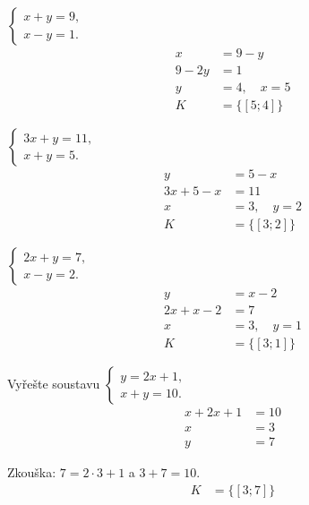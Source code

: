 \documentclass[11pt,a4paper]{article}
\begin{document}
\begin{zadaniReseniBox}[title={Samostatná práce 1}]
$\begin{cases}x+y=9,\\x-y=1.\end{cases}$
\tcblower
\[
\begin{aligned}
x&=9-y \\
 9-2y&=1 \\
 y&=4,\quad x=5 \\[2mm]
K &= \{[5;4]\}
\end{aligned}
\]
\end{zadaniReseniBox}
\begin{zadaniReseniBox}[title={Samostatná práce 2}]
$\begin{cases}3x+y=11,\\x+y=5.\end{cases}$
\tcblower
\[
\begin{aligned}
y&=5-x \\
 3x+5-x&=11 \\
 x&=3,\quad y=2 \\[2mm]
K &= \{[3;2]\}
\end{aligned}
\]
\end{zadaniReseniBox}
\begin{zadaniReseniBox}[title={Samostatná práce 3}]
$\begin{cases}2x+y=7,\\x-y=2.\end{cases}$
\tcblower
\[
\begin{aligned}
y&=x-2 \\
 2x+x-2&=7 \\
 x&=3,\quad y=1 \\[2mm]
K &= \{[3;1]\}
\end{aligned}
\]
\end{zadaniReseniBox}
\begin{zadaniReseniBox}[title={Samostatná práce 4}]
Vyřešte soustavu $\begin{cases}y=2x+1,\\x+y=10.\end{cases}$
\tcblower
\[
\begin{aligned}
x+2x+1&=10 \\
 x&=3 \\
 y&=7
\end{aligned}
\]

Zkouška: $7=2\cdot3+1$ a $3+7=10$.
\[
\begin{aligned}
K &= \{[3;7]\}
\end{aligned}
\]
\end{zadaniReseniBox}
\end{document}
